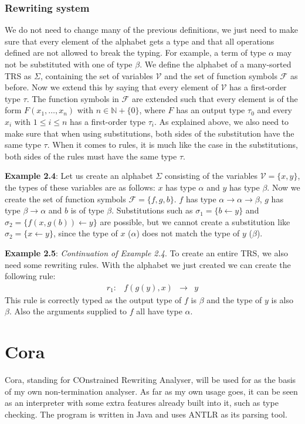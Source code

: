 \subsubsection{Rewriting system}
We do not need to change many of the previous definitions, we just need to make sure that every element of the alphabet gets a type and that all operations defined are not allowed to break the typing. For example, a term of type $\alpha$ may not be substituted with one of type $\beta$.\newline
We define the alphabet of a many-sorted TRS as $\Sigma$, containing the set of variables $\mathcal{V}$ and the set of function symbols $\mathcal{F}$ as before. Now we extend this by saying that every element of $\mathcal{V}$ has a first-order type $\tau$. The function symbols in $\mathcal{F}$ are extended such that every element is of the form $F(x_1, \dots, x_n)$ with $n \in \mathbb{N} + \{0\}$, where $F$ has an output type $\tau_0$ and every $x_i$ with $1 \leq i \leq n$ has a first-order type $\tau_i$. \newline
As explained above, we also need to make sure that when using substitutions, both sides of the substitution have the same type $\tau$.\newline
When it comes to rules, it is much like the case in the substitutions, both sides of the rules must have the same type $\tau$.\newline

\textbf{Example 2.4}: Let us create an alphabet $\Sigma$ consisting of the variables $\mathcal{V} = \{ x, y\}$, the types of these variables are as follows: $x$ has type $\alpha$ and $y$ has type $\beta$. Now we create the set of function symbols $\mathcal{F} = \{ f, g, b \}$. $f$ has type $\alpha \rightarrow \alpha \rightarrow \beta$, $g$ has type $\beta \rightarrow \alpha$ and $b$ is of type $\beta$. Substitutions such as $\sigma_1 = \{ b \leftarrow y \}$ and $\sigma_2 = \{ f(x, g(b)) \leftarrow y \}$ are possible, but we cannot create a substitution like $\sigma_2 = \{ x \leftarrow y \}$, since the type of $x$ ($\alpha$) does not match the type of $y$ ($\beta$).\newline

\textbf{Example 2.5}: \textit{Continuation of Example 2.4}. To create an entire TRS, we also need some rewriting rules. With the alphabet we just created we can create the following rule: 
$$
\begin{array}{lrcl}
    r_1: & f(g(y), x) & \rightarrow & y
\end{array}
$$
This rule is correctly typed as the output type of $f$ is $\beta$ and the type of $y$ is also $\beta$. Also the arguments supplied to $f$ all have type $\alpha$. 

\section{Cora}
Cora, standing for COnstrained Rewriting Analyser\cite{Cora2019}, will be used for as the basis of my own non-termination analyser. As far as my own usage goes, it can be seen as an interpreter with some extra features already built into it, such as type checking. The program is written in Java and uses ANTLR\cite{Parr:2013:DAR:2501720} as its parsing tool.  
